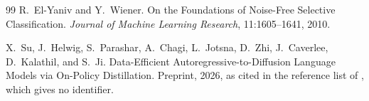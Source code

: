 \documentclass[11pt]{article}
\theoremstyle{remark}
\begin{document}
\begin{thebibliography}{99}
R.~El-Yaniv and Y.~Wiener.
On the Foundations of Noise-Free Selective Classification.
\emph{Journal of Machine Learning Research}, 11:1605--1641, 2010.

X.~Su, J.~Helwig, S.~Parashar, A.~Chagi, L.~Jotsna, D.~Zhi, J.~Caverlee, D.~Kalathil, and S.~Ji.
Data-Efficient Autoregressive-to-Diffusion Language Models via On-Policy Distillation.
Preprint, 2026, as cited in the reference list of \cite{li2026}, which gives no identifier.

\end{thebibliography}
\end{document}
